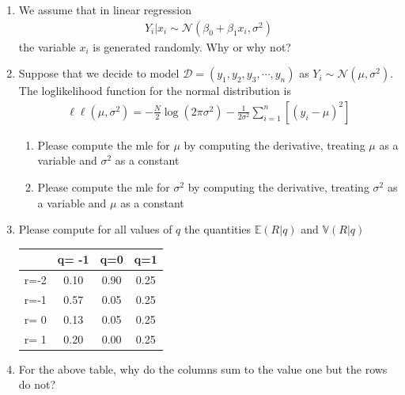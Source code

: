 \begin{enumerate}
    \item We assume that in linear regression 
    \begin{align}
        Y_{i} | x_{i} \sim \mathcal{N}\left( \beta_{0} + \beta_{1} x_{i}, \sigma^{2} \right)
    \end{align}
    the variable $x_{i}$ is generated randomly. Why or why not?
    
    \item Suppose that we decide to model $\mathcal{D} = ( y_{1}, y_{2}, y_{3}, \cdots, y_{n})$ as $Y_{i} \sim \mathcal{N}\left(\mu,\sigma^{2} \right)$. 
    The loglikelihood function for the normal distribution is
    \begin{align}
         \ell \ell(\mu, \sigma^{2}) = - \frac{N}{2} \log \left(2 \pi \sigma^{2}\right) - \frac{1}{2 \sigma^{2}} \sum_{i=1}^{n} \left[   \left (y_{i} - \mu \right)^{2} \right]
    \end{align}
    \begin{enumerate}
        \item Please compute the mle for $\mu$ by computing the derivative, treating $\mu$ as a variable and $\sigma^{2}$ as a constant 
        \item Please compute the mle for $\sigma^{2}$ by computing the derivative, treating $\sigma^{2}$ as a variable and $\mu$ as a constant 
    \end{enumerate}
    
    
    \item Please compute for all values of $q$ the quantities $\mathbb{E}(R|q)$ and $\mathbb{V}(R|q)$
    \begin{table}[ht!]
        \centering
        \begin{tabular}{c|ccc}
             & q= -1 & q=0 & q=1  \\
             \hline
        r=-2 & 0.10  & 0.90 & 0.25 \\
        r=-1 & 0.57  & 0.05 & 0.25 \\
        r= 0 & 0.13  & 0.05 & 0.25 \\
        r= 1 & 0.20  & 0.00 & 0.25 \\
        \end{tabular}
    \end{table}
    \item For the above table, why do the columns sum to the value one but the rows do not?
    

\end{enumerate}
